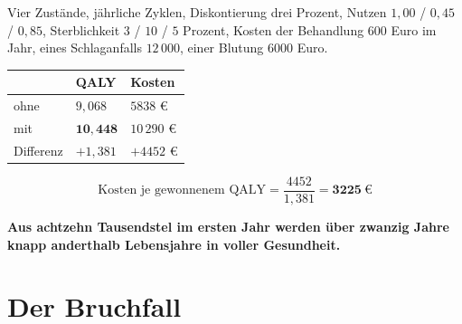 \begin{merksatz}
Vier Zustände, jährliche Zyklen, Diskontierung drei Prozent, Nutzen $1{,}00$ / $0{,}45$ / $0{,}85$, Sterblichkeit $3$ / $10$ / $5$ Prozent, Kosten der Behandlung $600$ Euro im Jahr, eines Schlaganfalls $12\,000$, einer Blutung $6000$ Euro.

\begin{center}
{\small
\renewcommand{\arraystretch}{1.5}
\begin{tabular}{@{}P{2.4cm}P{2.2cm}P{2.4cm}@{}}
\toprule
& \textbf{QALY} & \textbf{Kosten}\\
\midrule
ohne & $9{,}068$ & $5838$ €\\
mit & $\mathbf{10{,}448}$ & $10\,290$ €\\
\midrule
Differenz & $+1{,}381$ & $+4452$ €\\
\bottomrule
\end{tabular}}
\end{center}

\[ \text{Kosten je gewonnenem QALY} = \frac{4452}{1{,}381} = \mathbf{3225}\ \text{€} \]

\begin{center}
\begin{minipage}{0.9\textwidth}
\textbf{Aus achtzehn Tausendstel im ersten Jahr werden über zwanzig Jahre knapp anderthalb Lebensjahre in voller Gesundheit.}
\end{minipage}
\end{center}

\begin{center}
\begin{minipage}{0.88\textwidth}
\end{minipage}
\end{center}
\end{merksatz}

\section{Der Bruchfall}

